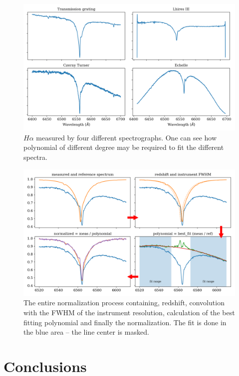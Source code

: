 \documentclass[10pt,a4paper,notitlepage,twocolumn]{article}
\begin{document}
\begin{figure}[hb]
	\label{four_spectra}
	\includegraphics[width=\columnwidth]{img/four_spectra_big.png}
	\caption{$H\alpha$ measured by four different spectrographs. One can see how polynomial of different degree may be required to fit the different spectra.}
\end{figure}

\begin{figure}[hb]
	\label{normalize_howto}
	\includegraphics[width=\columnwidth]{img/normalize_howto.png}
	\caption{The entire normalization process containing, redshift, convolution with the FWHM of the instrument resolution, calculation of the best fitting polynomial and finally the normalization. The fit is done in the blue area -- the line center is masked.}
\end{figure}


\section{Conclusions}



\end{document}
